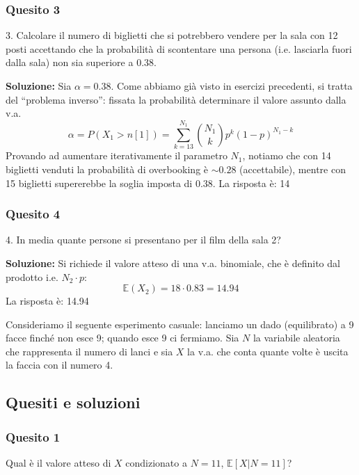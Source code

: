 \documentclass[12pt, a4paper]{article}
\begin{document}
\subsubsection*{Quesito 3}
3. Calcolare il numero di biglietti che si potrebbero vendere per la sala con 12 posti accettando che la probabilità di scontentare una persona (i.e. lasciarla fuori dalla sala) non sia superiore a 0.38.

\textbf{Soluzione:}
Sia $\alpha=0.38$. Come abbiamo già visto in esercizi precedenti, si tratta del ``problema inverso'': fissata la probabilità determinare il valore assunto dalla v.a.
$$ \alpha = P(X_1 > n[1]) = \sum_{k=13}^{N_1} \binom{N_1}{k} p^k (1-p)^{N_1-k} $$
Provando ad aumentare iterativamente il parametro $N_1$, notiamo che con 14 biglietti venduti la probabilità di overbooking è $\sim 0.28$ (accettabile), mentre con 15 biglietti supererebbe la soglia imposta di 0.38.
La risposta è: 14

\subsubsection*{Quesito 4}
4. In media quante persone si presentano per il film della sala 2?

\textbf{Soluzione:}
Si richiede il valore atteso di una v.a. binomiale, che è definito dal prodotto i.e. $N_2 \cdot p$:
$$ \mathbb{E}(X_2) = 18 \cdot 0.83 = 14.94 $$
La risposta è: 14.94

\newpage

\vspace{0.5cm}
\begin{tcolorbox}[colback=lightergray!10, colframe=tocsec, title=\textbf{Esercizio 3}]
Consideriamo il seguente esperimento casuale: lanciamo un dado (equilibrato) a 9 facce finché non esce 9; quando esce 9 ci fermiamo. Sia $N$ la variabile aleatoria che rappresenta il numero di lanci e sia $X$ la v.a. che conta quante volte è uscita la faccia con il numero 4.
\end{tcolorbox}

\subsection*{Quesiti e soluzioni}

\subsubsection*{Quesito 1}
Qual è il valore atteso di $X$ condizionato a $N=11$, $\mathbb{E}[X|N=11]$?
\end{document}
